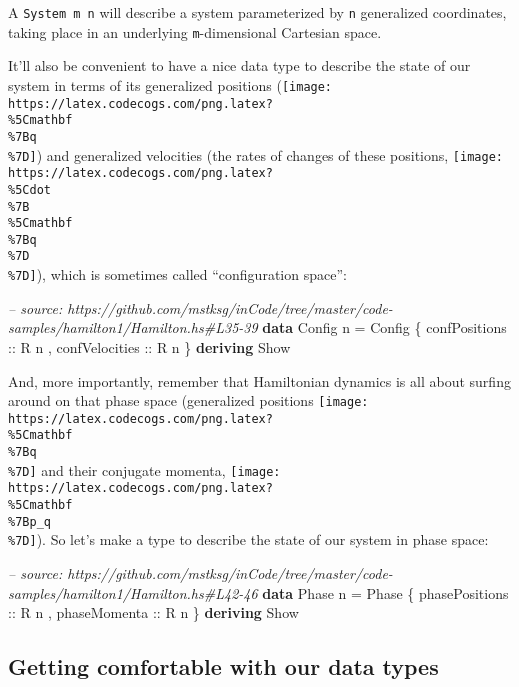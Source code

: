 \documentclass[]{article}
\newenvironment{Shaded}{}{}
\newcommand{\KeywordTok}[1]{\textcolor[rgb]{0.00,0.44,0.13}{\textbf{#1}}}
\newcommand{\DataTypeTok}[1]{\textcolor[rgb]{0.56,0.13,0.00}{#1}}
\newcommand{\CommentTok}[1]{\textcolor[rgb]{0.38,0.63,0.69}{\textit{#1}}}
\newcommand{\OtherTok}[1]{\textcolor[rgb]{0.00,0.44,0.13}{#1}}
\newcommand{\FunctionTok}[1]{\textcolor[rgb]{0.02,0.16,0.49}{#1}}
\newcommand{\NormalTok}[1]{#1}
\begin{document}
A \texttt{System\ m\ n} will describe a system parameterized by \texttt{n}
generalized coordinates, taking place in an underlying \texttt{m}-dimensional
Cartesian space.

It'll also be convenient to have a nice data type to describe the state of our
system in terms of its generalized positions
(\texttt{[image: https://latex.codecogs.com/png.latex?\\\%5Cmathbf\\\%7Bq\\\%7D]}) and
generalized velocities (the rates of changes of these positions,
\texttt{[image: https://latex.codecogs.com/png.latex?\\\%5Cdot\\\%7B\\\%5Cmathbf\\\%7Bq\\\%7D\\\%7D]}),
which is sometimes called ``configuration space'':

\begin{Shaded}
\begin{Highlighting}[]
\CommentTok{-- source: https://github.com/mstksg/inCode/tree/master/code-samples/hamilton1/Hamilton.hs#L35-39}
\KeywordTok{data} \DataTypeTok{Config}\NormalTok{ n }\FunctionTok{=} \DataTypeTok{Config}
\NormalTok{    \{}\OtherTok{ confPositions  ::} \DataTypeTok{R}\NormalTok{ n}
\NormalTok{    ,}\OtherTok{ confVelocities ::} \DataTypeTok{R}\NormalTok{ n}
\NormalTok{    \}}
  \KeywordTok{deriving} \DataTypeTok{Show}
\end{Highlighting}
\end{Shaded}

And, more importantly, remember that Hamiltonian dynamics is all about surfing
around on that phase space (generalized positions
\texttt{[image: https://latex.codecogs.com/png.latex?\\\%5Cmathbf\\\%7Bq\\\%7D]} and
their conjugate momenta,
\texttt{[image: https://latex.codecogs.com/png.latex?\\\%5Cmathbf\\\%7Bp\_q\\\%7D]}).
So let's make a type to describe the state of our system in phase space:

\begin{Shaded}
\begin{Highlighting}[]
\CommentTok{-- source: https://github.com/mstksg/inCode/tree/master/code-samples/hamilton1/Hamilton.hs#L42-46}
\KeywordTok{data} \DataTypeTok{Phase}\NormalTok{ n }\FunctionTok{=} \DataTypeTok{Phase}
\NormalTok{    \{}\OtherTok{ phasePositions ::} \DataTypeTok{R}\NormalTok{ n}
\NormalTok{    ,}\OtherTok{ phaseMomenta   ::} \DataTypeTok{R}\NormalTok{ n}
\NormalTok{    \}}
  \KeywordTok{deriving} \DataTypeTok{Show}
\end{Highlighting}
\end{Shaded}

\subsection{Getting comfortable with our data
types}\label{getting-comfortable-with-our-data-types}
\end{document}

